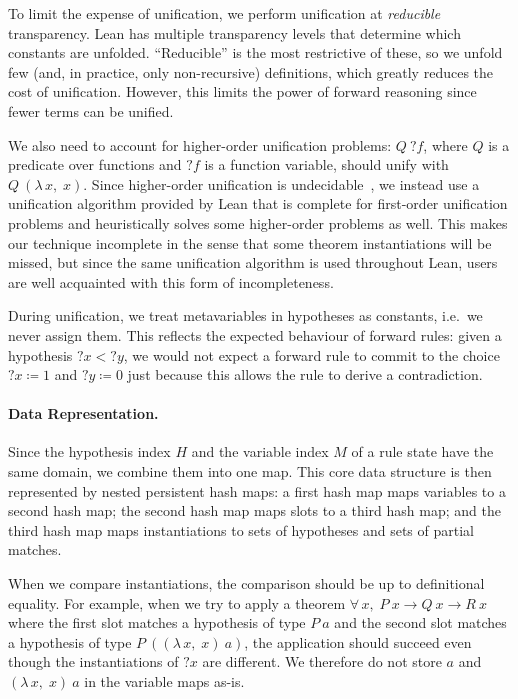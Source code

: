 \documentclass[runningheads]{llncs}
\newcommand{\Lam}[2]{\ensuremath{\lambda\, #1,\; #2}}
\newcommand{\All}[2]{\ensuremath{\forall\, #1,\; #2}}
\newcommand{\mvar}[1]{\ensuremath{?#1}}
\begin{document}
To limit the expense of unification, we perform unification at \emph{reducible} transparency.
Lean has multiple transparency levels that determine which constants are unfolded.
\enquote{Reducible} is the most restrictive of these, so we unfold few (and, in practice, only non-recursive) definitions, which greatly reduces the cost of unification.
However, this limits the power of forward reasoning since fewer terms can be unified.

We also need to account for higher-order unification problems: $Q~\mvar{f}$, where $Q$ is a predicate over functions and $\mvar{f}$ is a function variable, should unify with $Q~(\Lam{x}{x})$.
Since higher-order unification is undecidable~\cite{ThirdOrderUnificationUndecidableLucchesi,ThirdOrderUnificationUndecidableHuet,SecondOrderUnificationUndecidable}, we instead use a unification algorithm provided by Lean that is complete for first-order unification problems and heuristically solves some higher-order problems as well.
This makes our technique incomplete in the sense that some theorem instantiations will be missed, but since the same unification algorithm is used throughout Lean, users are well acquainted with this form of incompleteness.

During unification, we treat metavariables in hypotheses as constants, i.e.\ we never assign them.
This reflects the expected behaviour of forward rules: given a hypothesis $\mvar{x} < \mvar{y}$, we would not expect a forward rule to commit to the choice $\mvar{x} ≔ 1$ and $\mvar{y} ≔ 0$ just because this allows the rule to derive a contradiction.

\paragraph{Data Representation.}
Since the hypothesis index $H$ and the variable index $M$ of a rule state have the same domain, we combine them into one map.
This core data structure is then represented by nested persistent hash maps: a first hash map maps variables to a second hash map; the second hash map maps slots to a third hash map; and the third hash map maps instantiations to sets of hypotheses and sets of partial matches.

When we compare instantiations, the comparison should be up to definitional equality.
For example, when we try to apply a theorem $\All{x}{P~x → Q~x → R~x}$ where the first slot matches a hypothesis of type $P~a$ and the second slot matches a hypothesis of type $P~((\Lam{x}{x})~a)$, the application should succeed even though the instantiations of $\mvar{x}$ are different.
We therefore do not store $a$ and $(\Lam{x}{x})~a$ in the variable maps as-is.
\end{document}
